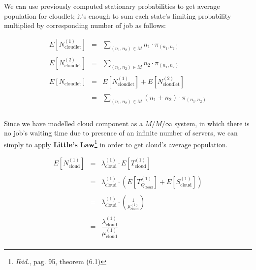 \documentclass[10pt,a4paper]{article}
\begin{document}
We can use previously computed stationary probabilities to get average population for cloudlet; it's enough to sum each state's limiting probability multiplied by corresponding number of job as follows:

\begin{equation}
\label{eq:cloudletAveragePopulation}
\begin{array} {rcl} 
E[N_{\text{cloudlet}}^{(1)}] & = & \displaystyle \sum_{ (n_1, n_2) \in M} n_1 \cdot \pi_{(n_1,n_2)}  \\\\

E[N_{\text{cloudlet}}^{(2)}] & = & \displaystyle \sum_{ (n_1, n_2) \in M} n_2 \cdot \pi_{(n_1,n_2)}  \\\\

E[N_{\text{cloudlet}}] & = & E[N_{\text{cloudlet}}^{(1)}] + E[N_{\text{cloudlet}}^{(2)}] \\\\

& = & \displaystyle \sum_{ (n_1, n_2) \in M} (n_1 + n_2) \cdot \pi_{(n_1,n_2)} \\\\

\end{array}
\end{equation}

Since we have modelled cloud component as a $M/M/\infty$ system, in which there is no job's waiting time due to presence of an infinite number of servers, we can simply to apply \textbf{Little’s Law}\footnote{\textit{Ibid.}, pag. 95, theorem (6.1)} in order to get cloud's average population.

\begin{equation}
\label{eq:cloudAveragePopulation1}
\begin{array} {rcl} 
E[N_{\text{cloud}}^{(1)}] & = & \lambda_{\text{cloud}}^{(1)} \cdot E[T_{\text{cloud}}^{(1)}]  \\\\

& = & \lambda_{\text{cloud}}^{(1)} \cdot (E[T_{Q_{\text{cloud}}}^{(1)}] + E[S_{\text{cloud}}^{(1)}])  \\\\

& = & \lambda_{\text{cloud}}^{(1)} \cdot (\frac{1}{\mu_{\text{cloud}}^{(1)}}) \\\\

& = & \dfrac{\lambda_{\text{cloud}}^{(1)}}{\mu_{\text{cloud}}^{(1)}} \\

\end{array}
\end{equation}
\end{document}
